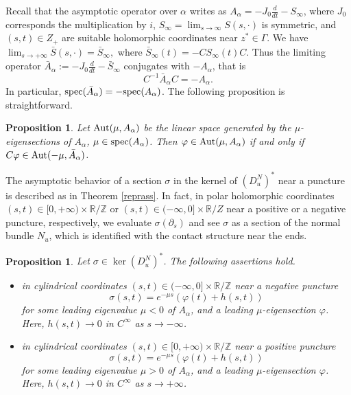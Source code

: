 \documentclass{amsart}
\newcommand{\R}{\mathbb{R}}
\newcommand{\Z}{\mathbb{Z}}
\newtheorem{prop}[theorem]{Proposition}
\begin{document}
Recall that the asymptotic operator over $\alpha$ writes as $A_{\alpha}=-J_0\frac{d}{dt}-S_ {\infty}$, where $J_0$ corresponds the multiplication by $i$, $S_\infty=\lim_{s\to \infty} S(s,\cdot)$ is symmetric, and $(s,t) \in Z_+$ are suitable holomorphic coordinates near $z^*\in \Gamma.$  We have
$\lim_{s \to +\infty}\bar S(s,\cdot) = \bar{S}_{\infty},$
  where $\bar{S}_{\infty}(t)=-CS_{\infty}(t)C$. Thus the limiting operator  $\bar{A}_{\alpha}:=-J_0\frac{d}{dt}-\bar{S}_{\infty}$ conjugates with $-A_\alpha$, that is
\begin{equation}
C^{-1}\bar{A}_{\alpha}C=-A_{\alpha}.
\label{eq:cac1}
\end{equation}
In particular, ${\rm spec}(\bar A_\alpha) = - {\rm spec}(A_\alpha)$. %
The following proposition is straightforward. 

\begin{prop} \label{AbarA} 
Let ${\rm Aut}(\mu, A_{\alpha})$ be the linear space generated by the $\mu$-eigensections of $A_\alpha$, $\mu \in {\rm spec}(A_\alpha)$. Then $\varphi \in {\rm Aut}(\mu, A_ {\alpha})$ if and only if $C\varphi \in {\rm Aut}(-\mu, \bar{A}_{\alpha})$. 
\end{prop}

The asymptotic behavior of a section $\sigma$ in the kernel of $(D_u^N)^*$ near a puncture is described as in Theorem \ref{reprass}. In fact, in polar holomorphic coordinates $(s,t) \in [0,+\infty) \times\R/ \Z$ or $(s,t)\in (-\infty,0] \times \R / Z$ near a positive or a negative puncture, respectively, we evaluate $\sigma(\partial_s)$ and see $\sigma$ as a section of the normal bundle $N_u$, which is identified with the contact structure near the ends. 

\begin{prop} \label{kerDu}
Let $\sigma\in \ker (D_u^{N})^*$. The following assertions hold.
\begin{itemize}

\item[(i)] in cylindrical coordinates $(s,t) \in (-\infty,0]\times \R / \Z$ near a negative puncture
\begin{equation}
\sigma(s,t)=e^{-\mu s}(\varphi(t)+h(s,t))
\label{eq:sigmaeq1}
\end{equation}
for some leading eigenvalue $\mu<0$  of $A_\alpha$, and a leading $\mu$-eigensection $\varphi$. Here, $h(s,t) \to 0$ in $C^\infty$ as $s \to -\infty$.

\item[(ii)] in cylindrical coordinates $(s,t) \in [0,+\infty)\times \R / \Z$ near a positive puncture
\begin{equation}
\sigma(s,t)=e^{-\mu s}(\varphi(t)+h(s,t))
\label{eq:sigmaeq2}
\end{equation}
for some leading eigenvalue $\mu>0$ of $A_\alpha$, and a leading $\mu$-eigensection $\varphi$. Here, $h(s,t) \to 0$ in $C^\infty$ as $s \to +\infty$.
\end{itemize}
\end{prop}
\end{document}
